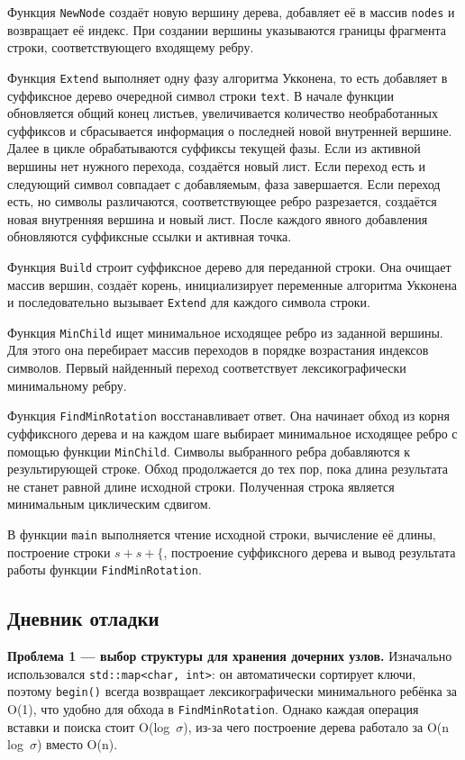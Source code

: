\documentclass[12pt]{article}
\begin{document}
Функция \texttt{NewNode} создаёт новую вершину дерева, добавляет её в
массив \texttt{nodes} и возвращает её индекс. При создании вершины
указываются границы фрагмента строки, соответствующего входящему ребру.

Функция \texttt{Extend} выполняет одну фазу алгоритма Укконена, то есть
добавляет в суффиксное дерево очередной символ строки \texttt{text}. В
начале функции обновляется общий конец листьев, увеличивается количество
необработанных суффиксов и сбрасывается информация о последней новой
внутренней вершине. Далее в цикле обрабатываются суффиксы текущей фазы.
Если из активной вершины нет нужного перехода, создаётся новый лист. Если
переход есть и следующий символ совпадает с добавляемым, фаза
завершается. Если переход есть, но символы различаются, соответствующее
ребро разрезается, создаётся новая внутренняя вершина и новый лист. После
каждого явного добавления обновляются суффиксные ссылки и активная точка.

Функция \texttt{Build} строит суффиксное дерево для переданной строки.
Она очищает массив вершин, создаёт корень, инициализирует переменные
алгоритма Укконена и последовательно вызывает \texttt{Extend} для каждого
символа строки.

Функция \texttt{MinChild} ищет минимальное исходящее ребро из заданной
вершины. Для этого она перебирает массив переходов в порядке возрастания
индексов символов. Первый найденный переход соответствует
лексикографически минимальному ребру.

Функция \texttt{FindMinRotation} восстанавливает ответ. Она начинает
обход из корня суффиксного дерева и на каждом шаге выбирает минимальное
исходящее ребро с помощью функции \texttt{MinChild}. Символы выбранного
ребра добавляются к результирующей строке. Обход продолжается до тех пор,
пока длина результата не станет равной длине исходной строки. Полученная
строка является минимальным циклическим сдвигом.

В функции \texttt{main} выполняется чтение исходной строки, вычисление её
длины, построение строки $s + s + \texttt{\{}$, построение суффиксного
дерева и вывод результата работы функции \texttt{FindMinRotation}. 

\subsection*{Дневник отладки}

\textbf{Проблема 1 — выбор структуры для хранения дочерних узлов.}
Изначально использовался \texttt{std::map<char,~int>}: он автоматически
сортирует ключи, поэтому \texttt{begin()} всегда возвращает
лексикографически минимального ребёнка за O(1), что удобно для
обхода в \texttt{FindMinRotation}. Однако каждая операция вставки
и поиска стоит O(log~$\sigma$), из-за чего построение дерева
работало за O(n log~$\sigma$) вместо O(n).
\end{document}
